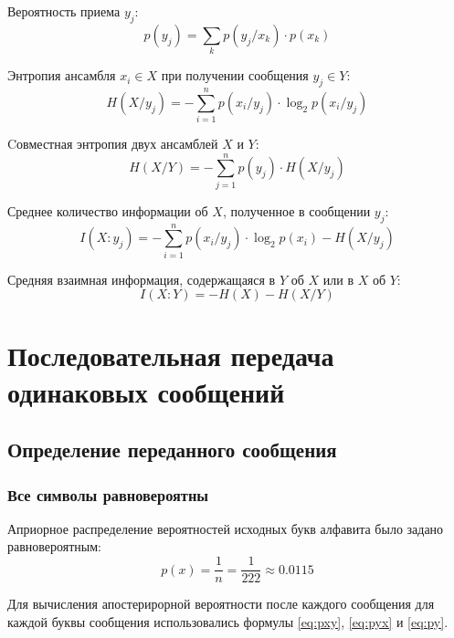 Вероятность приема $y_j$:
\begin{equation}\label{eq:py}
	p(y_j) = \sum_k p(y_j/x_k)\cdot p(x_k)
\end{equation}

Энтропия ансамбля $x_i \in X$ при получении сообщения $y_j \in Y$:
\begin{equation}\label{eq:hxyj}
	H(X/y_j) = - \sum_{i=1}^n p(x_i/y_j)\cdot \log_2 p(x_i/y_j)
\end{equation}

Cовместная энтропия двух ансамблей $X$ и $Y$: 
\begin{equation}\label{eq:hxy}
	H(X/Y) = - \sum_{j=1}^n p(y_j)\cdot H(X/y_j)
\end{equation}

Среднее количество информации об $X$, полученное в сообщении $y_j$:
\begin{equation}\label{eq:ixyj}
	I(X:y_j) = - \sum_{i=1}^n p(x_i/y_j)\cdot \log_2 p(x_i) - H(X/y_j)
\end{equation}

Средняя взаимная информация, содержащаяся в $Y$ об $X$ или в $X$ об $Y$: 
\begin{equation}\label{eq:ixy}
	I(X:Y) = - H(X) - H(X/Y)
\end{equation}

\section{Последовательная передача одинаковых сообщений}

\subsection{Определение переданного сообщения}

\subsubsection{Все символы равновероятны}\label{sec:uniform}

Априорное распределение вероятностей исходных букв алфавита было задано равновероятным:
\begin{equation}
	p(x) = \frac{1}{n} = \frac{1}{222} \approx 0.0115
\end{equation}

Для вычисления апостерирорной вероятности после каждого сообщения для каждой буквы сообщения использовались формулы \ref{eq:pxy}, \ref{eq:pyx} и \ref{eq:py}.

